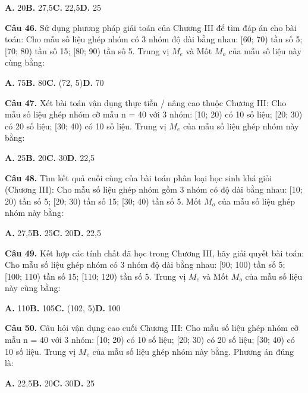 \documentclass[11pt,a4paper]{article}
\begin{document}
\hspace*{1.5em}\textbf{A.} 20\quad\quad \textbf{B.} 27,5\quad\quad \textbf{C.} 22,5\quad\quad \textbf{D.} 25\par\vspace{2pt}
\textbf{\color{primary} Câu 46.} Sử dụng phương pháp giải toán của Chương III để tìm đáp án cho bài toán: Cho mẫu số liệu ghép nhóm có 3 nhóm độ dài bằng nhau: [60; 70) tần số 5; [70; 80) tần số 15; [80; 90) tần số 5. Trung vị $M_e$ và Mốt $M_o$ của mẫu số liệu này cùng bằng:\par
\hspace*{1.5em}\textbf{A.} 75\quad\quad \textbf{B.} 80\quad\quad \textbf{C.} (72, 5)\quad\quad \textbf{D.} 70\par\vspace{2pt}
\textbf{\color{primary} Câu 47.} Xét bài toán vận dụng thực tiễn / nâng cao thuộc Chương III: Cho mẫu số liệu ghép nhóm cỡ mẫu n = 40 với 3 nhóm: [10; 20) có 10 số liệu; [20; 30) có 20 số liệu; [30; 40) có 10 số liệu. Trung vị $M_e$ của mẫu số liệu ghép nhóm này bằng:\par
\hspace*{1.5em}\textbf{A.} 25\quad\quad \textbf{B.} 20\quad\quad \textbf{C.} 30\quad\quad \textbf{D.} 22,5\par\vspace{2pt}
\textbf{\color{primary} Câu 48.} Tìm kết quả cuối cùng của bài toán phân loại học sinh khá giỏi (Chương III): Cho mẫu số liệu ghép nhóm gồm 3 nhóm có độ dài bằng nhau: [10; 20) tần số 5; [20; 30) tần số 15; [30; 40) tần số 5. Mốt $M_o$ của mẫu số liệu ghép nhóm này bằng:\par
\hspace*{1.5em}\textbf{A.} 27,5\quad\quad \textbf{B.} 25\quad\quad \textbf{C.} 20\quad\quad \textbf{D.} 22,5\par\vspace{2pt}
\textbf{\color{primary} Câu 49.} Kết hợp các tính chất đã học trong Chương III, hãy giải quyết bài toán: Cho mẫu số liệu ghép nhóm có 3 nhóm độ dài bằng nhau: [90; 100) tần số 5; [100; 110) tần số 15; [110; 120) tần số 5. Trung vị $M_e$ và Mốt $M_o$ của mẫu số liệu này cùng bằng:\par
\hspace*{1.5em}\textbf{A.} 110\quad\quad \textbf{B.} 105\quad\quad \textbf{C.} (102, 5)\quad\quad \textbf{D.} 100\par\vspace{2pt}
\textbf{\color{primary} Câu 50.} Câu hỏi vận dụng cao cuối Chương III: Cho mẫu số liệu ghép nhóm cỡ mẫu n = 40 với 3 nhóm: [10; 20) có 10 số liệu; [20; 30) có 20 số liệu; [30; 40) có 10 số liệu. Trung vị $M_e$ của mẫu số liệu ghép nhóm này bằng. Phương án đúng là:\par
\hspace*{1.5em}\textbf{A.} 22,5\quad\quad \textbf{B.} 20\quad\quad \textbf{C.} 30\quad\quad \textbf{D.} 25\par\vspace{2pt}
\end{document}
